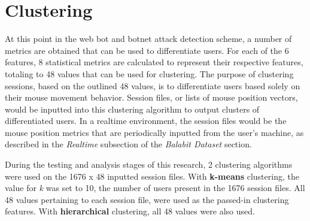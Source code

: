 
\section{Clustering}\label{sec:clustering}
At this point in the web bot and botnet attack detection scheme, a number of metrics are obtained that can be used to differentiate users.
For each of the 6 features, 8 statistical metrics are calculated to represent their respective features, totaling to 48 values that can be used for clustering.
The purpose of clustering sessions, based on the outlined 48 values, is to differentiate users based solely on their mouse movement behavior.
Session files, or lists of mouse position vectors, would be inputted into this clustering algorithm to output clusters of differentiated users.
In a realtime environment, the session files would be the mouse position metrics that are periodically inputted from the user's machine, as described in the \textit{Realtime} subsection of the \textit{Balabit Dataset} section.

During the testing and analysis stages of this research, 2 clustering algorithms were used on the 1676 x 48 inputted session files.
With \textbf{k-means} clustering, the value for \textit{k} was set to 10, the number of users present in the 1676 session files. All 48 values pertaining to each session file, were used as the passed-in clustering features.
With \textbf{hierarchical} clustering, all 48 values were also used.

